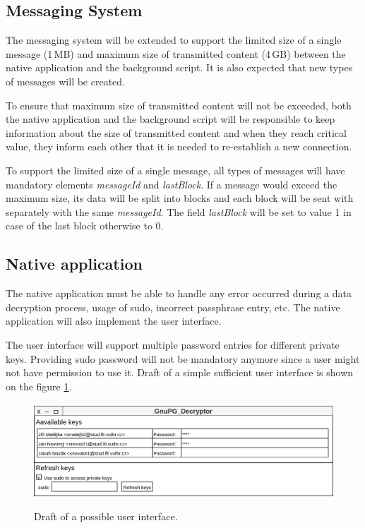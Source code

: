 \subsection{Messaging System}
The messaging system will be extended to support the limited size of a single message (1\,MB) and maximum size of transmitted content (4\,GB) between the native application and the background script. It is also expected that new types of messages will be created.

To ensure that maximum size of transmitted content will not be exceeded, both the native application and the background script will be responsible to keep information about the size of transmitted content and when they reach critical value, they inform each other that it is needed to re-establish a new connection.

To support the limited size of a single message, all types of messages will have mandatory elements \textit{messageId} and \textit{lastBlock}. If a message would exceed the maximum size, its data will be split into blocks and each block will be sent with separately with the same \textit{messageId}. The field \textit{lastBlock} will be set to value 1 in case of the last block otherwise to 0.

\subsection{Native application}
The native application must be able to handle any error occurred during a data decryption process, usage of sudo, incorrect passphrase entry, etc. The native application will also implement the user interface.

The user interface will support multiple password entries for different private keys. Providing sudo password will not be mandatory anymore since a user might not have permission to use it. Draft of a simple sufficient user interface is shown on the figure \ref{img:userInterfaceDesign}.

\begin{figure}[H]
    \begin{center}
        \label{img:userInterfaceDesign}
        \includegraphics[width=1.0\textwidth]{obrazky-figures/UI-design.png}
        \caption{Draft of a possible user interface.}
    \end{center}
\end{figure}

